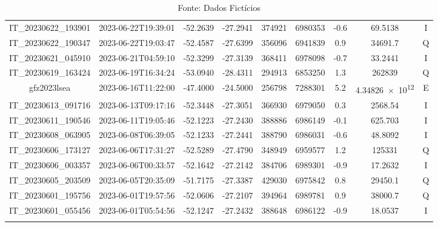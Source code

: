 \begin{center}
\begin{longtable}{ccccS[table-format=6.0]S[table-format=7.0]ccc}
\begin{adjustbox}{width=\textwidth}
    IT\_20230622\_193901 & 2023-06-22T19:39:01 & -52.2639 & -27.2941 & 374921 & 6980353 & -0.6 & \num[round-precision=3,round-mode=figures,scientific-notation=true]{69.5138} & I \\
    IT\_20230622\_190347 & 2023-06-22T19:03:47 & -52.4587 & -27.6399 & 356096 & 6941839 & 0.9 & \num[round-precision=3,round-mode=figures,scientific-notation=true]{34691.7} & Q \\
    IT\_20230621\_045910 & 2023-06-21T04:59:10 & -52.3299 & -27.3139 & 368411 & 6978098 & -0.7 & \num[round-precision=3,round-mode=figures,scientific-notation=true]{33.2441} & I \\
    IT\_20230619\_163424 & 2023-06-19T16:34:24 & -53.0940 & -28.4311 & 294913 & 6853250 & 1.3 & \num[round-precision=3,round-mode=figures,scientific-notation=true]{262839} & Q \\
    gfz2023lsea & 2023-06-16T11:22:00 & -47.4000 & -24.5000 & 256798 & 7288301 & 5.2 & \num[round-precision=3,round-mode=figures,scientific-notation=true]{4.34826e+12} & E \\
    IT\_20230613\_091716 & 2023-06-13T09:17:16 & -52.3448 & -27.3051 & 366930 & 6979050 & 0.3 & \num[round-precision=3,round-mode=figures,scientific-notation=true]{2568.54} & I \\
    IT\_20230611\_190546 & 2023-06-11T19:05:46 & -52.1223 & -27.2430 & 388886 & 6986149 & -0.1 & \num[round-precision=3,round-mode=figures,scientific-notation=true]{625.703} & I \\
    IT\_20230608\_063905 & 2023-06-08T06:39:05 & -52.1233 & -27.2441 & 388790 & 6986031 & -0.6 & \num[round-precision=3,round-mode=figures,scientific-notation=true]{48.8092} & I \\
    IT\_20230606\_173127 & 2023-06-06T17:31:27 & -52.5289 & -27.4790 & 348949 & 6959577 & 1.2 & \num[round-precision=3,round-mode=figures,scientific-notation=true]{125331} & Q \\
    IT\_20230606\_003357 & 2023-06-06T00:33:57 & -52.1642 & -27.2142 & 384706 & 6989301 & -0.9 & \num[round-precision=3,round-mode=figures,scientific-notation=true]{17.2632} & I \\
    IT\_20230605\_203509 & 2023-06-05T20:35:09 & -51.7175 & -27.3387 & 429030 & 6975842 & 0.8 & \num[round-precision=3,round-mode=figures,scientific-notation=true]{29450.1} & Q \\
    IT\_20230601\_195756 & 2023-06-01T19:57:56 & -52.0606 & -27.2107 & 394964 & 6989781 & 0.9 & \num[round-precision=3,round-mode=figures,scientific-notation=true]{38000.7} & Q \\
    IT\_20230601\_055456 & 2023-06-01T05:54:56 & -52.1247 & -27.2432 & 388648 & 6986122 & -0.9 & \num[round-precision=3,round-mode=figures,scientific-notation=true]{18.0537} & I \\
    \bottomrule
    \caption*{Fonte: Dados Fictícios}
\end{adjustbox}
\end{longtable}
\end{center}

